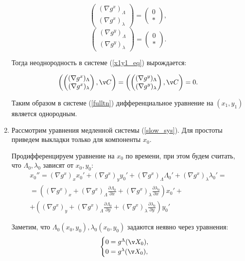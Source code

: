 \begin{enumerate}
$$\begin{pmatrix} (\nabla g^x)_\Lambda \\ (\nabla g^x)_\lambda \end{pmatrix} = \begin{pmatrix} 0 \\ * \end{pmatrix},$$
$$\begin{pmatrix} (\nabla g^y)_\Lambda \\ (\nabla g^y)_\lambda \end{pmatrix} = \begin{pmatrix} 0 \\ * \end{pmatrix}.$$

Тогда неоднородность в системе (\ref{x1y1_eq}) вырождается:

$$\left( \begin{pmatrix} (\nabla g^x)_\Lambda \\ (\nabla g^x)_\lambda \end{pmatrix},\v C \right) = \left( \begin{pmatrix} (\nabla g^y)_\Lambda \\ (\nabla g^y)_\lambda \end{pmatrix},\v C \right) = 0.$$

Таким образом в системе (\ref{fulltn}) дифференциальное уравнение на $(x_1,y_1)$ является однородным.

\item 

Рассмотрим уравнения медленной системы (\ref{slow_sys}). Для простоты приведем выкладки только для компоненты $x_0$.

Продифференцируем уравнение на $x_0$ по времени, при этом будем считать, что $\Lambda_0, \lambda_0$ зависят от $x_0,y_0$:
\begin{multline}
x_0'' = (\nabla g^x)_x x_0' + (\nabla g^x)_y y_0' + (\nabla g^x)_\Lambda \Lambda_0' + (\nabla g^x)_\lambda \lambda_0' = \\
= 
\left( (\nabla g^x)_x + (\nabla g^x)_\Lambda\frac{\partial \Lambda_0}{\partial x} + (\nabla g^x)_\lambda\frac{\partial \lambda_0}{\partial x} \right) x_0' +\\
+\left( (\nabla g^x)_y + (\nabla g^x)_\Lambda\frac{\partial \Lambda_0}{\partial y} + (\nabla g^x)_\lambda\frac{\partial \lambda_0}{\partial y} \right) y_0'
\label{xdd_eq}
\end{multline}

Заметим, что $\Lambda_0(x_0,y_0), \lambda_0(x_0,y_0)$ задаются неявно через уравнения:
\begin{equation}
    \begin{cases}
        0=g^\Lambda(\v X_0), \\
        0=g^\lambda(\v X_0), \\
    \end{cases}
\end{equation}


\end{enumerate}
